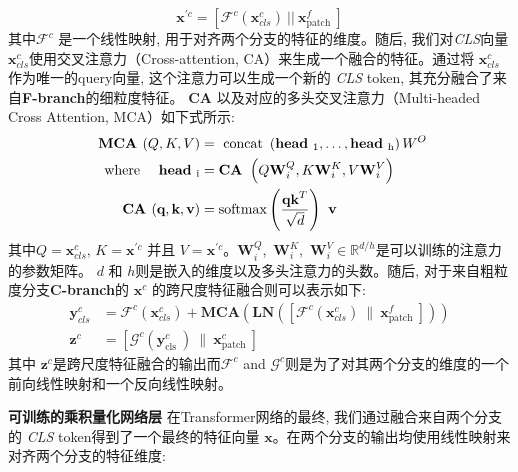 \begin{equation}
    \mathbf{x}^{\prime c}=\left[\mathcal{F}^{c}\left(\mathbf{x}_{c l s}^{c}\right) \ || \ \mathbf{x}_{\text {patch }}^{f}\right]
\end{equation}
其中$\mathcal{F}^c$ 是一个线性映射, 用于对齐两个分支的特征的维度。随后, 我们对\textit{CLS}向量$\mathbf{x}_{cls}^c$使用交叉注意力（Cross-attention, CA）来生成一个融合的特征。通过将 $\mathbf{x}_{cls}^c$ 作为唯一的query向量, 这个注意力可以生成一个新的 \textit{CLS} token, 其充分融合了来自\textbf{F-branch}的细粒度特征。  \textbf{CA} 以及对应的多头交叉注意力（Multi-headed Cross Attention, MCA）如下式所示:
\begin{equation}
    \begin{aligned}
    \textbf{ MCA }(Q, K, V) &=\text { concat }\left(\textbf{head}_{\ 1}, \ldots, \textbf{head}_{\ \mathrm{h}}\right) W^{O} \\
    \text { where \quad \textbf{head}}_{\ \mathrm{i}} &= \textbf{CA }\left(Q \mathbf{W}_{i}^{Q}, K \mathbf{W}_{i}^{K}, V \mathbf{W}_{i}^{V}\right) \\
    \textbf{ CA }(\textbf{q}, \textbf{k}, \textbf{v})  &= \operatorname{softmax}\left(\frac{\textbf{q} \textbf{k}^{T}}{\sqrt{d}}\right) \textbf{ v}
    \end{aligned}
\end{equation}
其中$Q = \mathbf{x}_{cls}^{c}$, $K = \mathbf{x}^{\prime c}$ 并且 $V = \mathbf{x}^{\prime c}$。$\mathbf{W}^Q_i$,~$\mathbf{W}^K_i$,~$\mathbf{W}^V_i \in \mathbb{R}^{d/h}$是可以训练的注意力的参数矩阵。 $d$ 和 $h$则是嵌入的维度以及多头注意力的头数。随后, 对于来自粗粒度分支\textbf{C-branch}的 $\mathbf{x}^c$ 的跨尺度特征融合则可以表示如下:
\begin{equation}
    \begin{aligned}
\mathbf{y}_{c l s}^{c} &= \mathcal{F}^{c}\left(\mathbf{x}_{c l s}^{c}\right)+\textbf{MCA}\left(\textbf{LN}\left(\left[\mathcal{F}^{c}\left(\mathbf{x}_{c l s}^{c}\right) \ \| \ \mathbf{x}_{\text {patch }}^{f}\right]\right)\right) \\
\mathbf{z}^{c} &=\left[\mathcal{G}^{c}\left(\mathbf{y}_{\text {cls }}^{c}\right) \ \| \ \mathbf{x}_{\text {patch }}^{c}\right]
\end{aligned}
\end{equation}
其中 $\mathbf{z}^c$是跨尺度特征融合的输出而$\mathcal{F}^c$ and $\mathcal{G}^c$则是为了对其两个分支的维度的一个前向线性映射和一个反向线性映射。\par
\textbf{可训练的乘积量化网络层}\quad
在Transformer网络的最终, 我们通过融合来自两个分支的 \textit{CLS} token得到了一个最终的特征向量 $\mathbf{x}$。在两个分支的输出均使用线性映射来对齐两个分支的特征维度:
